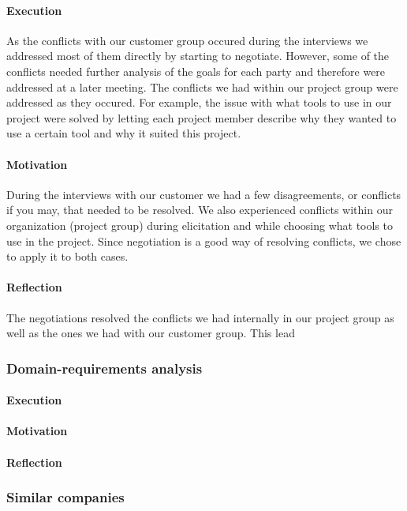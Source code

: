 \documentclass[10pt]{article}
\begin{document}
\paragraph{Execution}
\hfill \break
As the conflicts with our customer group occured during the interviews we addressed most of them directly by starting to negotiate. However, some of the conflicts needed further analysis of the goals for each party and therefore were addressed at a later meeting. The conflicts we had within our project group were addressed as they occured. For example, the issue with what tools to use in our project were solved by letting each project member describe why they wanted to use a certain tool and why it suited this project. 
\paragraph{Motivation}
\hfill \break
During the interviews with our customer we had a few disagreements, or conflicts if you may, that needed to be resolved. We also experienced conflicts within our organization (project group) during elicitation and while choosing what tools to use in the project. Since negotiation is a good way of resolving conflicts, we chose to apply it to both cases.
\paragraph{Reflection}
\hfill \break
The negotiations resolved the conflicts we had internally in our project group as well as the ones we had with our customer group. This lead 


\subsubsection{Domain-requirements analysis}
\paragraph{Execution}
\paragraph{Motivation}
\paragraph{Reflection}


\subsubsection{Similar companies}
\end{document}
